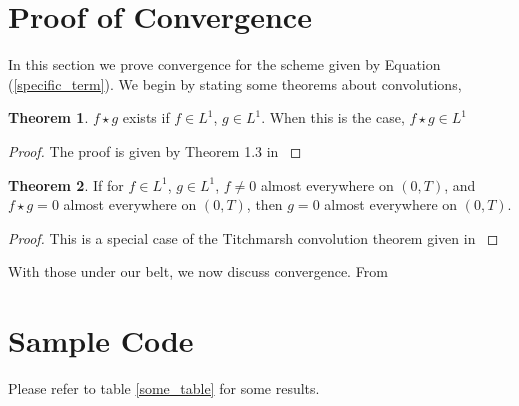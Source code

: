 \documentclass[11pt]{article}
\numberwithin{equation}{section}
\theoremstyle{definition}
\newtheorem{theorem}{Theorem}[section]
\newcommand{\eqr}[1]{Equation (\ref{#1})}
\begin{document}
\section{Proof of Convergence}
In this section we prove convergence for the scheme given by \eqr{specific_term}.
We begin by stating some theorems about convolutions,
\begin{theorem}
	\label{convolution_exists}
	$f \star g$ exists if $f \in L^1$, $g \in L^1$. When this is the case, $f \star g \in L^1$
\end{theorem}
\begin{proof}
The proof is given by Theorem 1.3 in \cite{stein71}
\end{proof}

\begin{theorem}
	\label{titchmarsh}
	If for $f \in L^1$, $g \in L^1$, $f \neq 0$ almost everywhere on $(0, T)$, and $f \star g = 0$ almost everywhere on $(0, T)$, then $g = 0$ almost everywhere on $(0, T)$.
\end{theorem}
\begin{proof}
This is a special case of the Titchmarsh convolution theorem given in \cite{titchmarsh}
\end{proof}

With those under our belt, we now discuss convergence. From 
\section{Sample Code}
\lstset{caption=Basic Scheme}

\lstset{caption=Lubich Scheme}

Please refer to table \ref{some_table} for some results.
\end{document}
